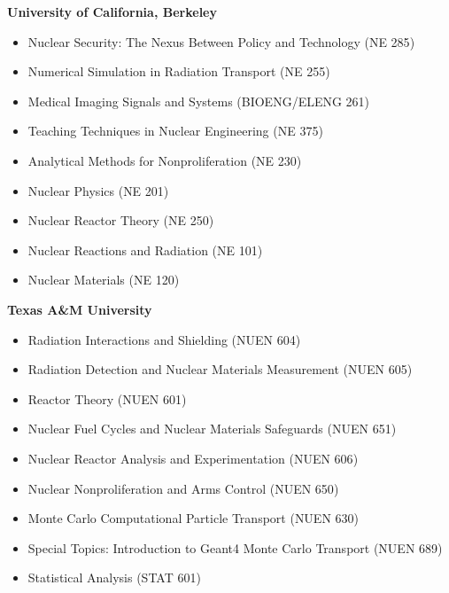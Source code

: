 \documentclass[margin, 10pt]{style/res} %
\begin{document}
\begin{resume}
\textbf{University of California, Berkeley}\\[-2.3ex]
\begin{itemize}[leftmargin=4ex] \itemsep -2pt
\item Nuclear Security: The Nexus Between Policy and Technology ({\footnotesize{NE 285}})
\item Numerical Simulation in Radiation Transport ({\footnotesize{NE 255}})
\item Medical Imaging  Signals and Systems ({\footnotesize{BIOENG/ELENG 261}})
\item Teaching Techniques in Nuclear Engineering ({\footnotesize{NE 375}})
\item Analytical Methods for Nonproliferation ({\footnotesize{NE 230}})
\item Nuclear Physics ({\footnotesize{NE 201}})
\item Nuclear Reactor Theory ({\footnotesize{NE 250}})
\item Nuclear Reactions and Radiation ({\footnotesize{NE 101}})
\item Nuclear Materials ({\footnotesize{NE 120}})
\end{itemize}

\textbf{Texas A\&M University}\\[-2.3ex]
\begin{itemize}[leftmargin=4ex] \itemsep -2pt
\item Radiation Interactions and Shielding ({\footnotesize{NUEN 604}})
\item Radiation Detection and Nuclear Materials Measurement ({\footnotesize{NUEN 605}})
\item Reactor Theory ({\footnotesize{NUEN 601}})
\item Nuclear Fuel Cycles and Nuclear Materials Safeguards ({\footnotesize{NUEN 651}})
\item Nuclear Reactor Analysis and Experimentation ({\footnotesize{NUEN 606}})
\item Nuclear Nonproliferation and Arms Control ({\footnotesize{NUEN 650}})
\item Monte Carlo Computational Particle Transport ({\footnotesize{NUEN 630}})
\item Special Topics: Introduction to Geant4 Monte Carlo Transport ({\footnotesize{NUEN 689}})
\item Statistical Analysis ({\footnotesize{STAT 601}})
\end{itemize}


\end{resume}
\end{document}
